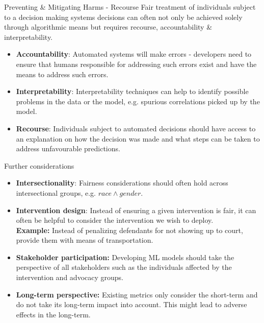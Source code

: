 \documentclass[11pt,compress,t,notes=noshow, xcolor=table]{beamer}
\begin{document}
\begin{vbframe}{Preventing \& Mitigating Harms - Recourse}
    Fair treatment of individuals subject to a decision making systems decisions can often not only be achieved solely through algorithmic means but requires recourse, accountability \& interpretability.
    \begin{itemize}
        \item \textbf{Accountability}: Automated systems will make errors - developers need to ensure that humans responsible for addressing such errors exist and have the means to address such errors.
        \item \textbf{Interpretability}: Interpretability techniques can help to identify possible problems in the data or the model, e.g. spurious correlations picked up by the model.
        \item \textbf{Recourse}: Individuals subject to automated decisions should have access to an explanation on how the decision was made and what steps can be taken to address unfavourable predictions.
    \end{itemize} 
\end{vbframe}


\begin{vbframe}{Further considerations}
    \begin{itemize}
        \item \textbf{Intersectionality}: Fairness considerations should often hold across intersectional groups, e.g. $race \land gender$.
        \item \textbf{Intervention design}: Instead of ensuring a given intervention is fair, it can often be helpful to consider the intervention we wish to deploy. \\
        \textbf{Example:} Instead of penalizing defendants for not showing up to court, provide them with means of transportation.
        \item \textbf{Stakeholder participation:} Developing ML models should take the perspective of all stakeholders such as the individuals affected by the intervention and advocacy groups.
        \item \textbf{Long-term perspective:} Existing metrics only consider the short-term and do not take its long-term impact into account. This might lead to adverse effects in the long-term.
    \end{itemize}
\end{vbframe}
\end{document}
